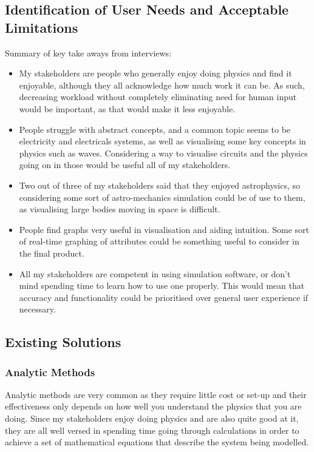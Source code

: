 \documentclass[11pt]{article}
\begin{document}
        \subsection{Identification of User Needs and Acceptable Limitations}
            Summary of key take aways from interviews:
            \begin{itemize}
                \item My stakeholders are people who generally enjoy doing physics and find it enjoyable, although they all acknowledge how much work it can be. As such, decreasing workload without completely eliminating need for human input would be important, as that would make it less enjoyable.
                \item People struggle with abstract concepts, and a common topic seems to be electricity and electricals systems, as well as visualising some key concepts in physics such as waves. Considering a way to visualise circuits and the physics going on in those would be useful all of my stakeholders.
                \item Two out of three of my stakeholders said that they enjoyed astrophysics, so considering some sort of astro-mechanics simulation could be of use to them, as visualising large bodies moving in space is difficult.
                \item People find graphs very useful in visualisation and aiding intuition. Some sort of real-time graphing of attributes could be something useful to consider in the final product.
                \item All my stakeholders are competent in using simulation software, or don't mind spending time to learn how to use one properly. This would mean that accuracy and functionality could be prioritised over general user experience if necessary. 
            \end{itemize}

        \subsection{Existing Solutions}
            \subsubsection{Analytic Methods}
                Analytic methods are very common as they require little cost or set-up and their effectiveness only depends on how well you understand the physics that you are doing. Since my stakeholders enjoy doing physics and are also quite good at it, they are all well versed in spending time going through calculations in order to achieve a set of mathematical equations that describe the system being modelled. 
\end{document}
